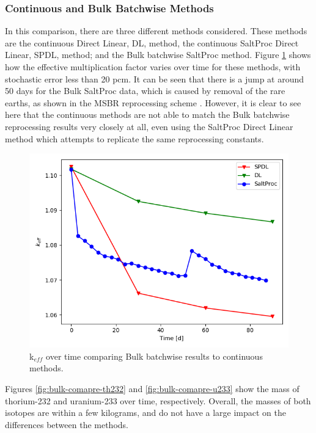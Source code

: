 \subsubsection{Continuous and Bulk Batchwise Methods}
\label{s:bulk}

In this comparison, there are three different methods considered. These methods are the continuous Direct Linear, DL, method, the continuous SaltProc Direct Linear, SPDL, method; and the Bulk batchwise SaltProc method. Figure \ref{fig:bulk-comapre-keff} shows how the effective multiplication factor varies over time for these methods, with stochastic error less than 20 pcm.
It can be seen that there is a jump at around 50 days for the Bulk SaltProc data, which is caused by removal of the rare earths, as shown in the MSBR reprocessing scheme \cite{robertson_conceptual_1971}. However, it is clear to see here that the continuous methods are not able to match the Bulk batchwise reprocessing results very closely at all, even using the SaltProc Direct Linear method which attempts to replicate the same reprocessing constants.

\begin{figure}[H]
  \centering
  \includegraphics[scale=0.7]{images/soln-3-keff.png}
  \caption{k$_{eff}$ over time comparing Bulk batchwise results to continuous methods.}
   \label{fig:bulk-comapre-keff}
\end{figure}

Figures \ref{fig:bulk-comapre-th232} and \ref{fig:bulk-comapre-u233} show the mass of thorium-232 and uranium-233 over time, respectively. Overall, the masses of both isotopes are within a few kilograms, and do not have a large impact on the differences between the methods.

